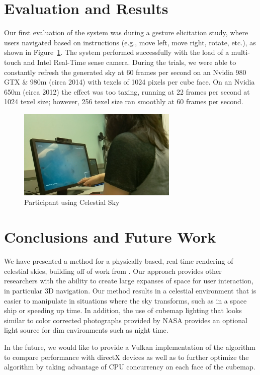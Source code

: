 \documentclass{vgtc}                         %
\begin{document}
\section{Evaluation and Results}

Our first evaluation of the system was during a gesture elicitation study, where users navigated based on instructions (e.g., move left, move right, rotate, etc.), as shown in Figure~\ref{fig:expphoto}. The system performed successfully with the load of a multi-touch and Intel Real-Time sense camera. During the trials, we were able to constantly refresh the generated sky at 60 frames per second on an Nvidia 980 GTX \& 980m (circa 2014) with texels of 1024 pixels per cube face. On an Nvidia 650m (circa 2012) the effect was too taxing, running at 22 frames per second at 1024 texel size; however, 256 texel size ran smoothly at 60 frames per second.

\begin{figure}[bth]
  \centering
  \includegraphics[width=3.0in]{../images/experiment-photo}
  \caption{Participant using Celestial Sky}
  \label{fig:expphoto}
\end{figure}
\section{Conclusions and Future Work}



We have presented a method for a physically-based, real-time rendering of celestial skies, building off of work from \cite{Jensen:2001fr}. Our approach provides other researchers with the ability to create large expanses of space for user interaction, in particular 3D navigation. Our method results in a celestial environment that is easier to manipulate in situations where the sky transforms, such as in a space ship or speeding up time. In addition, the use of cubemap lighting that looks similar to color corrected photographs provided by NASA provides an optional light source for dim environments such as night time.

In the future, we would like to provide a Vulkan implementation of the algorithm to compare performance with directX devices as well as to further optimize the algorithm by taking advantage of CPU concurrency on each face of the cubemap.  
\end{document}
